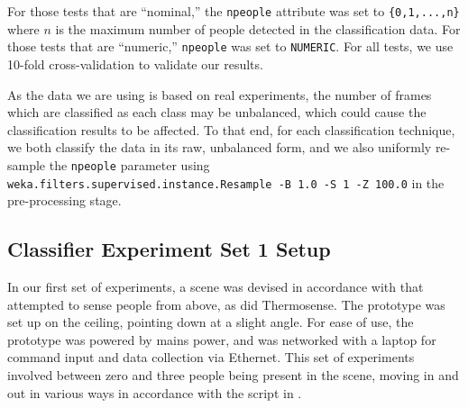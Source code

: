 \documentclass[../thesis/thesis.tex]{subfiles}
\begin{document}
For those tests that are ``nominal,'' the \texttt{npeople} attribute was set to \texttt{\{0,1,...,n\}} where $n$ is the maximum number of people detected in the classification data. For those tests that are ``numeric,'' \texttt{npeople} was set to \texttt{NUMERIC}. For all tests, we use 10-fold cross-validation to validate our results.

As the data we are using is based on real experiments, the number of frames which are classified as each class may be unbalanced, which could cause the classification results to be affected. To that end, for each classification technique, we both classify the data in its raw, unbalanced form, and we also uniformly re-sample the \texttt{npeople} parameter using \texttt{weka.filters.supervised.instance.Resample -B 1.0 -S 1 -Z 100.0} in the pre-processing stage.


\subsection{Classifier Experiment Set 1 Setup}
In our first set of experiments, a scene was devised in accordance with  that attempted to sense people from above, as did Thermosense. The prototype was set up on the ceiling, pointing down at a slight angle. For ease of use, the prototype was powered by mains power, and was networked with a laptop for command input and data collection via Ethernet. This set of experiments involved between zero and three people being present in the scene, moving in and out in various ways in accordance with the script in .
\end{document}
